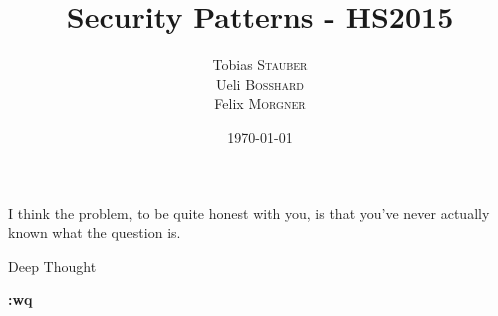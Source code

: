 \documentclass{report}
\title{Security Patterns - HS2015}
\author{Tobias \textsc{Stauber}\\Ueli \textsc{Bosshard}\\Felix \textsc{Morgner}}
\date{\today}
\begin{document}
\maketitle
\clearpage
\vspace*{\fill}
  \epigraph{I think the problem, to be quite honest with you, is that you've never actually known what the question is.}{Deep Thought}
\vfill
\clearpage

\setcounter{tocdepth}{0}
\tableofcontents



\clearpage
\vspace*{\fill}
\begin{center}
    { \huge \bfseries :wq }
\end{center}
\vfill
\clearpage
\end{document}

